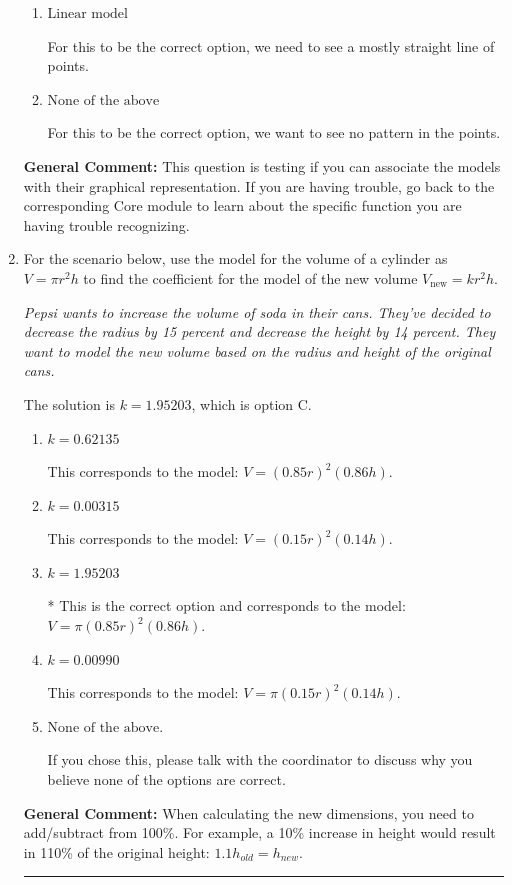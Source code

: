 \documentclass{extbook}[14pt]
\newcommand{\litem}[1]{\item #1

\rule{\textwidth}{0.4pt}}
\begin{document}
\begin{enumerate}
{\begin{enumerate}[label=\Alph*.]
For this to be the correct option, we want a rapid change early, then an extremely slow change later.
\item \( \text{Linear model} \)

For this to be the correct option, we need to see a mostly straight line of points.
\item \( \text{None of the above} \)

For this to be the correct option, we want to see no pattern in the points.
\end{enumerate}

\textbf{General Comment:} This question is testing if you can associate the models with their graphical representation. If you are having trouble, go back to the corresponding Core module to learn about the specific function you are having trouble recognizing.
}
\litem{
For the scenario below, use the model for the volume of a cylinder as $V = \pi r^2 h$ to find the coefficient for the model of the new volume $V_{\text{new}} = k r^2 h$.

\begin{center}
    \textit{ Pepsi wants to increase the volume of soda in their cans. They've decided to decrease the radius by 15 percent and decrease the height by 14 percent. They want to model the new volume based on the radius and height of the original cans. }
\end{center}
The solution is \( k = 1.95203 \), which is option C.\begin{enumerate}[label=\Alph*.]
\item \( k = 0.62135 \)

This corresponds to the model: $V = (0.85 r)^2 (0.86 h)$.
\item \( k = 0.00315 \)

This corresponds to the model: $V = (0.15 r)^2 (0.14 h)$.
\item \( k = 1.95203 \)

* This is the correct option and corresponds to the model: $V = \pi (0.85 r)^2 (0.86 h)$.
\item \( k = 0.00990 \)

This corresponds to the model: $V = \pi (0.15 r)^2 (0.14 h)$.
\item \( \text{None of the above.} \)

If you chose this, please talk with the coordinator to discuss why you believe none of the options are correct.
\end{enumerate}

\textbf{General Comment:} When calculating the new dimensions, you need to add/subtract from 100\%. For example, a 10\% increase in height would result in 110\% of the original height: $1.1h_{old} = h_{new}$.
}
\end{enumerate}
\end{document}
